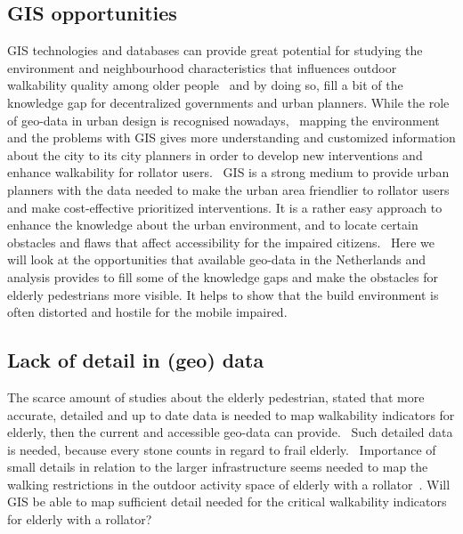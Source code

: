 \subsection{GIS opportunities}
GIS technologies and databases can provide great potential for studying the environment and neighbourhood characteristics that influences outdoor walkability quality among older people~\cite{Vine2012} and by doing so, fill a bit of the knowledge gap for decentralized governments and urban planners. While the role of geo-data in urban design is recognised nowadays,~\cite{Matthews2003} mapping the environment and the problems with GIS gives more understanding and customized information about the city to its city planners in order to develop new interventions and enhance walkability for rollator users.~\cite{Matthews2003, Svensson2010} GIS is a strong medium to provide urban planners with the data needed to make the urban area friendlier to rollator users and make cost-effective prioritized interventions. It is a rather easy approach to enhance the knowledge about the urban environment, and to locate certain obstacles and flaws that affect accessibility for the impaired citizens.~\cite{Svensson2010} Here we will look at the opportunities that available geo-data in the Netherlands and analysis provides to fill some of the knowledge gaps and make the obstacles for elderly pedestrians more visible. It helps to show that the build environment is often distorted and hostile for the mobile impaired.~\cite{Matthews2003}

\subsection{Lack of detail in (geo) data}
The scarce amount of studies about the elderly pedestrian, stated that more accurate, detailed and up to date data is needed to map walkability indicators for elderly, then the current and accessible geo-data can provide.~\cite{Verschuur2013, Laakso2011} Such detailed data is needed, because every stone counts in regard to frail elderly.~\cite{Matthews2003, Laakso2011} Importance of small details in relation to the larger infrastructure seems needed to map the walking restrictions in the outdoor activity space of elderly with a rollator~\cite{Stahl2008, Stahl2013}. Will GIS be able to map sufficient detail needed for the critical walkability indicators for elderly with a rollator? 

